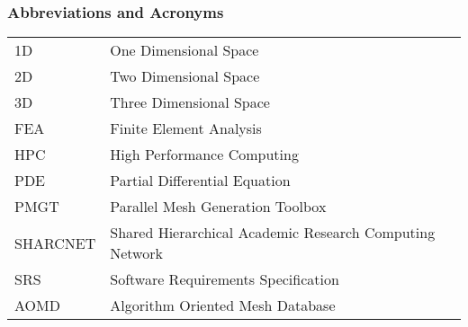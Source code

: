 \documentclass[12pt,titlepage]{article}
\begin{document}
\subsubsection{Abbreviations and Acronyms}
\begin{tabular}{p{\firstCol}p{\secondCol}} 
1D & One Dimensional Space\\
2D & Two Dimensional Space\\
3D & Three Dimensional Space\\
FEA & Finite Element Analysis\\
HPC & High Performance Computing\\
PDE & Partial Differential Equation\\
PMGT & Parallel Mesh Generation Toolbox\\
SHARCNET & Shared Hierarchical Academic Research Computing Network\\
SRS & Software Requirements Specification\\
AOMD & Algorithm Oriented Mesh Database\\
\end{tabular}
\newpage
\end{document}
